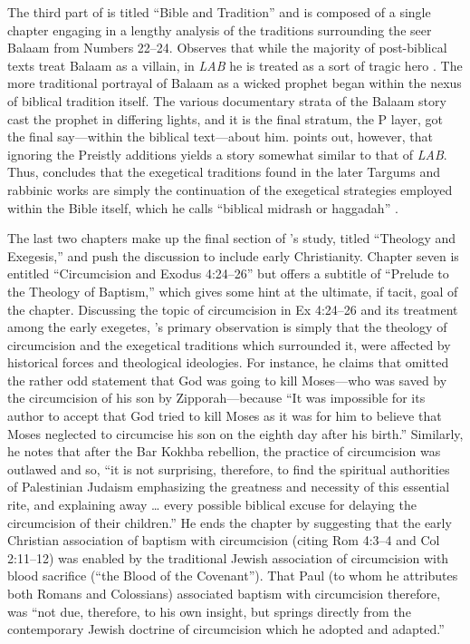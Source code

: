  The third part of  is titled ``Bible and Tradition'' and is composed of a single chapter engaging in a lengthy analysis of the traditions surrounding the seer Balaam from Numbers 22--24. \vermes Observes that while the majority of post-biblical texts treat Balaam as a villain, in \emph{LAB} he is treated as a sort of tragic hero \autocite[173]{vermes1961}. The more traditional portrayal of Balaam as a wicked prophet began within the nexus of biblical tradition itself. The various documentary strata of the Balaam story cast the prophet in differing lights, and it is the final stratum, the P layer, got the final say---within the biblical text---about him. \vermes points out, however, that ignoring the Preistly additions yields a story somewhat similar to that of \emph{LAB}. Thus, \vermes concludes that the exegetical traditions found in the later Targums and rabbinic works are simply the continuation of the exegetical strategies employed within the Bible itself, which he calls ``biblical midrash or haggadah'' \autocite[176]{vermes1961}. 

 The last two chapters make up the final section of \vermes's study, titled ``Theology and Exegesis,'' and push the discussion to include early Christianity. Chapter seven is entitled ``Circumcision and Exodus 4:24--26'' but offers a subtitle of ``Prelude to the Theology of Baptism,'' which gives some hint at the ultimate, if tacit, goal of the chapter. Discussing the topic of circumcision in Ex 4:24--26 and its treatment among the early exegetes, \vermes's primary observation is simply that the theology of circumcision and the exegetical traditions which surrounded it, were affected by historical forces and theological ideologies. For instance, he claims that \jub omitted the rather odd statement that God was going to kill Moses---who was saved by the circumcision of his son by Zipporah---because ``It was impossible for its author to accept that God tried to kill Moses as it was for him to believe that Moses neglected to circumcise his son on the eighth day after his birth.''\autocite[185]{vermes1961} Similarly, he notes that after the Bar Kokhba rebellion, the practice of circumcision was outlawed and so, ``it is not surprising, therefore, to find the spiritual authorities of Palestinian Judaism emphasizing the greatness and necessity of this essential rite, and explaining away \ldots{} every possible biblical excuse for delaying the circumcision of their children.''\autocite[189]{vermes1961} He ends the chapter by suggesting that the early Christian association of baptism with circumcision (citing Rom 4:3--4 and Col 2:11--12) was enabled by the traditional Jewish association of circumcision with blood sacrifice (``the Blood of the Covenant'')\autocite[190]{vermes1961}. That Paul (to whom he attributes both Romans and Colossians) associated baptism with circumcision therefore, was ``not due, therefore, to his own insight, but springs directly from the contemporary Jewish doctrine of circumcision which he adopted and adapted.''\autocite[191]{vermes1961} 

